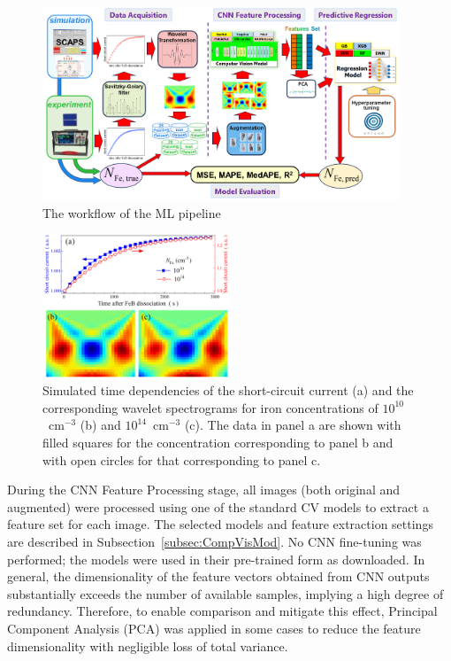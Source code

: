 \documentclass[10pt]{iopart}
\begin{document}
\begin{figure}
\includegraphics[width=0.95\textwidth]{Fig1}
\caption{\label{Fig1}
The workflow of the ML pipeline
}%
\end{figure}

\begin{figure}
\includegraphics[width=0.5\textwidth]{Fig2}
\caption{\label{Fig2}
Simulated time dependencies of the short-circuit current (a) 
and the corresponding wavelet spectrograms for iron concentrations 
of $10^{10}$~cm$^{-3}$ (b) and $10^{14}$~cm$^{-3}$ (c).
The data in panel a are shown with filled squares for the concentration corresponding to panel b
and with open circles for that corresponding to panel c.
}%
\end{figure}


During the CNN Feature Processing stage, all images (both original and augmented) were processed using one of the standard CV models 
to extract a feature set for each image. 
The selected models and feature extraction settings are described in Subsection~\ref{subsec:CompVisMod}. 
No CNN fine-tuning was performed; the models were used in their pre-trained form as downloaded.
In general, the dimensionality of the feature vectors obtained from CNN outputs substantially exceeds the number of available samples, 
implying a high degree of redundancy. 
Therefore, to enable comparison and mitigate this effect, Principal Component Analysis (PCA) was applied in some cases 
to reduce the feature dimensionality with negligible loss of total variance.
\end{document}
